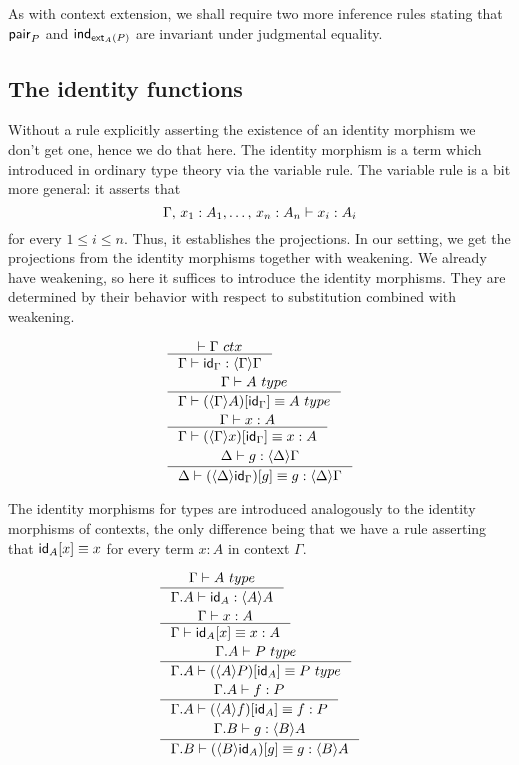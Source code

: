 As with context extension, we shall require two more inference rules stating that
$\mathsf{pair}_P$ and $\mathsf{ind}_{\mathsf{ext}_A(P)}$ are invariant under judgmental equality.

\subsection{The identity functions}
Without a rule explicitly asserting the existence of an identity morphism we don't
get one, hence we do that here. The identity morphism is a term which introduced
in ordinary type theory via the variable rule. The variable rule is a bit more
general: it asserts that
\begin{equation*}
\jterm{\Gamma,\,x_1:A_1,\ldots,\,x_n:A_n}{A_i}{x_i}
\end{equation*}
for every $1\leq i\leq n$. Thus, it establishes the projections. In our setting,
we get the projections from the identity morphisms together with weakening. We
already have weakening, so here it suffices to introduce the identity morphisms.
They are determined by their behavior with respect to substitution combined with
weakening.

\begin{align}
&\inference{\jctx{\Gamma}}{\jterm{\Gamma}{\ctxwk{\Gamma}{\Gamma}}{\idfunc[\Gamma]}}\label{ctxIdFuncForm}\\
&\inference{\jtype{\Gamma}{A}}{\jtypeeq{\Gamma}{\subst{\idfunc[\Gamma]}{\ctxwk{\Gamma}{A}}}{A}}\label{ctxIdFuncPbInvType}\\
&\inference{\jterm{\Gamma}{A}{x}}{\jtermeq{\Gamma}{A}{\subst{\idfunc[\Gamma]}{\ctxwk{\Gamma}{x}}}{x}}\label{ctxIdFuncPbInvTerm}\\
&\inference{\jterm{\Delta}{\ctxwk{\Delta}{\Gamma}}{g}}{\jtermeq{\Delta}{\ctxwk{\Delta}{\Gamma}}{\subst{g}{\ctxwk{\Delta}{\idfunc[\Gamma]}}}{g}}\label{ctxIdFuncSubstInvTerm}
\end{align}

The identity morphisms for types are introduced analogously to the identity
morphisms of contexts, the only difference being that we have a rule asserting
that $\subst{x}{\idfunc[A]}\jdeq x$ for every term $x:A$ in context $\Gamma$.

\begin{align}
& \inference{\jtype{\Gamma}{A}}{\jterm{\ctxext{\Gamma}{A}}{\ctxwk{A}{A}}{\idfunc[A]}}\\
& \inference{\jterm{\Gamma}{A}{x}}{\jtermeq{\Gamma}{A}{\subst{x}{\idfunc[A]}}{x}}\\
& \inference{\jtype{\ctxext{\Gamma}{A}}{P}}{\jtypeeq{\ctxext{\Gamma}{A}}{\subst{\idfunc[A]}{\ctxwk{A}{P}}}{P}}\\
& \inference{\jterm{\ctxext{\Gamma}{A}}{P}{f}}{\jtermeq{\ctxext{\Gamma}{A}}{P}{\subst{\idfunc[A]}{\ctxwk{A}{f}}}{f}} \\
& \inference{\jterm{\ctxext{\Gamma}{B}}{\ctxwk{B}{A}}{g}}{\jtermeq{\ctxext{\Gamma}{B}}{\ctxwk{B}{A}}{\subst{g}{\ctxwk{B}{\idfunc[A]}}}{g}}
\end{align}

